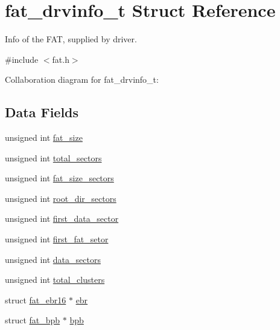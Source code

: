 \hypertarget{structfat__drvinfo__t}{}\section{fat\+\_\+drvinfo\+\_\+t Struct Reference}
\label{structfat__drvinfo__t}


Info of the F\+AT, supplied by driver.  




{\ttfamily \#include $<$fat.\+h$>$}



Collaboration diagram for fat\+\_\+drvinfo\+\_\+t\+:
\subsection*{Data Fields}
\begin{DoxyCompactItemize}
\item 
unsigned int \hyperlink{structfat__drvinfo__t_a1117076f96b9abe596cc88d060d54bb5_a1117076f96b9abe596cc88d060d54bb5}{fat\+\_\+size}
\item 
unsigned int \hyperlink{structfat__drvinfo__t_a47d5e31a3e5c6c314f49705a3961f7ea_a47d5e31a3e5c6c314f49705a3961f7ea}{total\+\_\+sectors}
\item 
unsigned int \hyperlink{structfat__drvinfo__t_a5914068d456ec39d658f9a6abfda2e53_a5914068d456ec39d658f9a6abfda2e53}{fat\+\_\+size\+\_\+sectors}
\item 
unsigned int \hyperlink{structfat__drvinfo__t_a6d1012bf1bf24392f0a6ce9135061769_a6d1012bf1bf24392f0a6ce9135061769}{root\+\_\+dir\+\_\+sectors}
\item 
unsigned int \hyperlink{structfat__drvinfo__t_aa699654d6c24b989c4e883d39adf2c30_aa699654d6c24b989c4e883d39adf2c30}{first\+\_\+data\+\_\+sector}
\item 
unsigned int \hyperlink{structfat__drvinfo__t_a69cc724ff65e1ebbf8321e29ea7a9da9_a69cc724ff65e1ebbf8321e29ea7a9da9}{first\+\_\+fat\+\_\+setor}
\item 
unsigned int \hyperlink{structfat__drvinfo__t_a25e043cab40af89e54687fa100b1abf1_a25e043cab40af89e54687fa100b1abf1}{data\+\_\+sectors}
\item 
unsigned int \hyperlink{structfat__drvinfo__t_af935fed26cf392e9e8149d5feb511e8d_af935fed26cf392e9e8149d5feb511e8d}{total\+\_\+clusters}
\item 
struct \hyperlink{structfat__ebr16}{fat\+\_\+ebr16} $\ast$ \hyperlink{structfat__drvinfo__t_a825f02713bdb8c993368eaf7857eff16_a825f02713bdb8c993368eaf7857eff16}{ebr}
\item 
struct \hyperlink{structfat__bpb}{fat\+\_\+bpb} $\ast$ \hyperlink{structfat__drvinfo__t_a5596cc2d01bcd3405718bee044412332_a5596cc2d01bcd3405718bee044412332}{bpb}
\end{DoxyCompactItemize}


